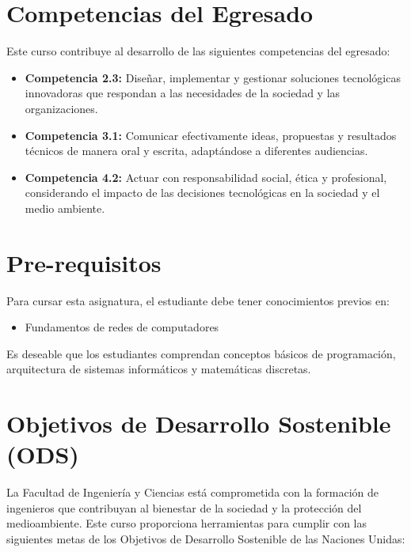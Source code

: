 \documentclass[12pt,a4paper]{article}
\begin{document}
\section*{Competencias del Egresado}

Este curso contribuye al desarrollo de las siguientes competencias del egresado:

\begin{itemize}
\item \textbf{Competencia 2.3:} Diseñar, implementar y gestionar soluciones tecnológicas innovadoras que respondan a las necesidades de la sociedad y las organizaciones.

\item \textbf{Competencia 3.1:} Comunicar efectivamente ideas, propuestas y resultados técnicos de manera oral y escrita, adaptándose a diferentes audiencias.

\item \textbf{Competencia 4.2:} Actuar con responsabilidad social, ética y profesional, considerando el impacto de las decisiones tecnológicas en la sociedad y el medio ambiente.
\end{itemize}

\section*{Pre-requisitos}

Para cursar esta asignatura, el estudiante debe tener conocimientos previos en:

\begin{itemize}
\item Fundamentos de redes de computadores
\end{itemize}

Es deseable que los estudiantes comprendan conceptos básicos de programación, arquitectura de sistemas informáticos y matemáticas discretas.

\section*{Objetivos de Desarrollo Sostenible (ODS)}

La Facultad de Ingeniería y Ciencias está comprometida con la formación de ingenieros que contribuyan al bienestar de la sociedad y la protección del medioambiente. Este curso proporciona herramientas para cumplir con las siguientes metas de los Objetivos de Desarrollo Sostenible de las Naciones Unidas:
\end{document}
